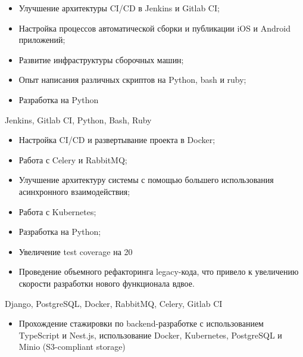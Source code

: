 \documentclass[10pt,a4paper,ragged2e,withhyper]{altacv}
\begin{document}
\begin{paracol}{2}


\begin{itemize}
\item Улучшение архитектуры CI/CD в Jenkins и Gitlab CI;
\item Настройка процессов автоматической сборки и публикации iOS и Android приложений;
\item Развитие инфраструктуры сборочных машин;
\item Опыт написания различных скриптов на Python, bash и ruby;
\item Разработка на Python
\end{itemize}
Jenkins, Gitlab CI, Python, Bash, Ruby

\divider


\begin{itemize}
\item Настройка CI/CD и развертывание проекта в Docker;
\item Работа с Celery и RabbitMQ;
\item Улучшение архитектуру системы с помощью большего использования асинхронного взаимодействия;
\item Работа с Kubernetes;
\item Разработка на Python;
\item Увеличение test coverage на 20%
\item Проведение объемного рефакторинга legacy-кода, что привело к увеличению скорости разработки нового функционала вдвое.
\end{itemize}
Django, PostgreSQL, Docker, RabbitMQ, Celery, Gitlab CI

\divider


\begin{itemize}
    \item Прохождение стажировки по backend-разработке с использованием TypeScript и Nest.js, использование Docker, Kubernetes, PostgreSQL и Minio (S3-compliant storage)
\end{itemize}


\end{paracol}
\end{document}
